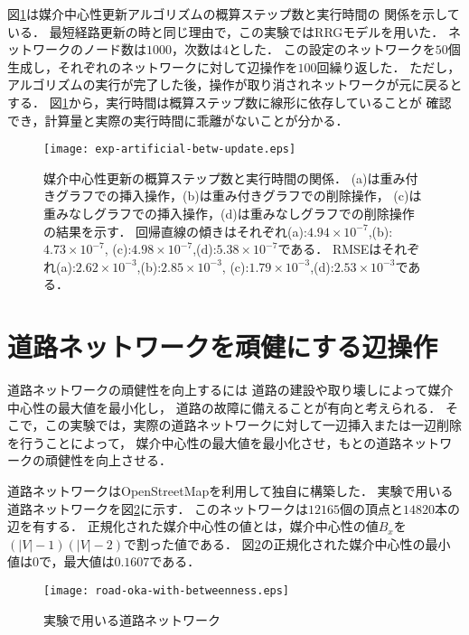 図\ref{fig:exp-artificial-betw-update}は媒介中心性更新アルゴリズムの概算ステップ数と実行時間の
関係を示している．
最短経路更新の時と同じ理由で，この実験ではRRGモデルを用いた．
ネットワークのノード数は$1000$，次数は$4$とした．
この設定のネットワークを$50$個生成し，それぞれのネットワークに対して辺操作を$100$回繰り返した．
ただし，アルゴリズムの実行が完了した後，操作が取り消されネットワークが元に戻るとする．
図\ref{fig:exp-artificial-betw-update}から，実行時間は概算ステップ数に線形に依存していることが
確認でき，計算量と実際の実行時間に乖離がないことが分かる．

\begin{figure}
  \centering
  \texttt{[image: exp-artificial-betw-update.eps]}
  \caption{
    媒介中心性更新の概算ステップ数と実行時間の関係．
    (a)は重み付きグラフでの挿入操作，(b)は重み付きグラフでの削除操作，
    (c)は重みなしグラフでの挿入操作，(d)は重みなしグラフでの削除操作の結果を示す．
    回帰直線の傾きはそれぞれ(a):$4.94\times10^{-7}$,(b):$4.73\times10^{-7}$,
    (c):$4.98\times10^{-7}$,(d):$5.38\times10^{-7}$である．
    RMSEはそれぞれ(a):$2.62\times10^{-3}$,(b):$2.85\times10^{-3}$,
    (c):$1.79\times10^{-3}$,(d):$2.53\times10^{-3}$である．
  }
  \label{fig:exp-artificial-betw-update}
\end{figure}

\section{道路ネットワークを頑健にする辺操作}

道路ネットワークの頑健性を向上するには
道路の建設や取り壊しによって媒介中心性の最大値を最小化し，
道路の故障に備えることが有向と考えられる．
そこで，この実験では，実際の道路ネットワークに対して一辺挿入または一辺削除を行うことによって，
媒介中心性の最大値を最小化させ，もとの道路ネットワークの頑健性を向上させる．

道路ネットワークはOpenStreetMap\cite{OpenStreetMap}を利用して独自に構築した．
実験で用いる道路ネットワークを図\ref{fig:road-okayama}に示す．
このネットワークは$12165$個の頂点と$14820$本の辺を有する．
正規化された媒介中心性の値とは，媒介中心性の値$B_x$を$(|V|-1)(|V|-2)$で割った値である．
図\ref{fig:road-okayama}の正規化された媒介中心性の最小値は$0$で，最大値は$0.1607$である．

\begin{figure}[tb]
  \centering
  \texttt{[image: road-oka-with-betweenness.eps]}
  \caption{
    実験で用いる道路ネットワーク
  }
  \label{fig:road-okayama}
\end{figure}

